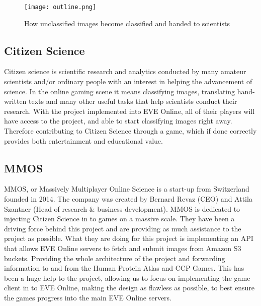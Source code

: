 \begin{figure}[H]
	\centering
	\graphicspath{ {./graphics/} }
    \centerline{\texttt{[image: outline.png]}}
    \caption{\label{fig:outline}How unclassified images become classified and handed to scientists}
\end{figure}

\subsection{Citizen Science}
Citizen science is scientific research and analytics conducted by many amateur scientists and/or ordinary people with an interest in helping the advancement of science. In the online gaming scene it means classifying images, translating hand-written texts and many other useful tasks that help scientists conduct their research. With the project implemented into EVE Online, all of their players will have access to the project, and able to start classifying images right away. Therefore contributing to Citizen Science through a game, which if done correctly provides both entertainment and educational value.

\subsection{MMOS}
MMOS, or Massively Multiplayer Online Science is a start-up from Switzerland founded in 2014. The company was created by Bernard Revaz (CEO) and Attila Szantner (Head of research \& business development). MMOS is dedicated to injecting Citizen Science in to games on a massive scale. They have been a driving force behind this project and are providing as much assistance to the project as possible. What they are doing for this project is implementing an API that allows EVE Online servers to fetch and submit images from Amazon S3 buckets. Providing the whole architecture of the project and forwarding information to and from the Human Protein Atlas and CCP Games. This has been a huge help to the project, allowing us to focus on implementing the game client in to EVE Online, making the design as flawless as possible, to best ensure the games progress into the main EVE Online servers.